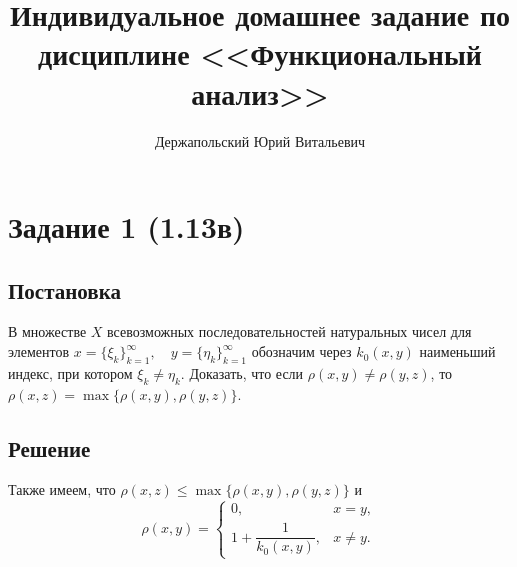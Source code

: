 \documentclass[14pt, a4paper, titlepage, fleqn]{extarticle}
\title{Индивидуальное домашнее задание по дисциплине <<Функциональный анализ>>}
\author{Держапольский Юрий Витальевич}
\date{}
\begin{document}
    \maketitle

    \tableofcontents

    \pagebreak

    \section{Задание 1 (1.13в)}

        \subsection{Постановка}
        В множестве \( X \) всевозможных последовательностей натуральных чисел для элементов 
        \( x = \{ \xi_k \}_{k=1}^\infty , \quad y = \{ \eta_k \}_{k=1}^\infty \)
        обозначим через \( k_0 (x, y) \) наименьший индекс, при котором \( \xi_k \neq \eta_k \). Доказать, что если \( \rho(x, y) \neq \rho(y,z) \), то \( \rho(x, z) = \max\{ \rho(x, y), \rho(y,z) \} \).

        
        \subsection{Решение}
        Также имеем, что \( \rho(x, z) \leq \max\{ \rho(x, y), \rho(y,z) \} \) и
        \[
            \rho(x, y) = 
            \begin{cases}
                0, & x = y, \\
                1 + \dfrac{1}{k_0(x,y)}, & x \neq y.
            \end{cases}
        \]
\end{document}
